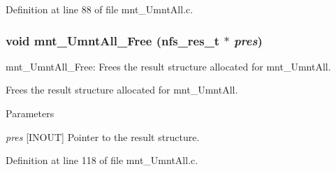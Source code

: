 Definition at line 88 of file mnt\_\-UmntAll.c.
\subsubsection[{mnt\_\-UmntAll\_\-Free}]{\setlength{\rightskip}{0pt plus 5cm}void mnt\_\-UmntAll\_\-Free (nfs\_\-res\_\-t $\ast$ {\em pres})}\label{mnt__UmntAll_8c_af84eedaff38cb8d39ab0230033cd66bf}
mnt\_\-UmntAll\_\-Free: Frees the result structure allocated for mnt\_\-UmntAll.

Frees the result structure allocated for mnt\_\-UmntAll.


\begin{DoxyParams}{Parameters}
\item[{\em pres}][INOUT] Pointer to the result structure. \end{DoxyParams}


Definition at line 118 of file mnt\_\-UmntAll.c.
